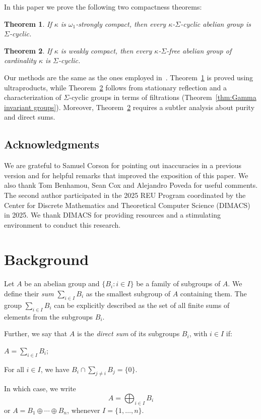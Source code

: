 \documentclass[a4paper]{amsart}
\newenvironment{enumerate-(i)}{\begin{enumerate}[label={\upshape (\roman*)}, leftmargin=2pc]}{\end{enumerate}}
\newtheorem{theorem}{Theorem}[section]
\theoremstyle{definition}
\theoremstyle{remark}
\numberwithin{equation}{section}
\begin{document}
In this paper we prove the following two compactness theorems:

\begin{theorem}
\label{thm : comp Sigma cyclic}
    If \(\kappa\) is \(\omega_1\)-strongly compact, then every \(\kappa\)-\(\Sigma\)-cyclic abelian group is \(\Sigma\)-cyclic.
\end{theorem}

\begin{theorem}
\label{thm : weak comp Sigma cyclic}
     If \(\kappa\) is weakly compact, then every \(\kappa\)-\(\Sigma\)-free abelian group of cardinality \(\kappa\) is \(\Sigma\)-cyclic.
\end{theorem}


Our methods are the same as the ones employed in~\cite{EklMek}. Theorem~\ref{thm : comp Sigma cyclic} is proved using ultraproducts, while Theorem~\ref{thm : weak comp Sigma cyclic} follows from stationary reflection and a characterization of \(\Sigma\)-cyclic groups in terms of filtrations (Theorem~\ref{thm:Gamma invariant groups}).
Moreover, Theorem~\ref{thm : weak comp Sigma cyclic} requires a subtler analysis about purity and direct sums.


\subsection*{Acknowledgments}
We are grateful to Samuel Corson for pointing out inaccuracies in a previous version and for helpful remarks that improved the exposition of this paper. We also thank Tom Benhamou, Sean Cox and Alejandro Poveda for useful comments. The second author participated in the 2025 REU Program coordinated by the 
Center for Discrete Mathematics and Theoretical Computer Science (DIMACS) in 2025. We thank DIMACS for providing resources and a stimulating environment to conduct this research.


\section{Background}
\label{sec : background}

Let \(A\) be an abelian group and \(\{B_i:i\in I\}\) be a family of subgroups of \(A\). We define their \emph{sum} \(\sum_{i\in I} B_i\) as the smallest subgroup of \(A\) containing them. The group \(\sum_{i\in I} B_i\) can be explicitly described as the set of all finite sums of elements from the subgroups \(B_i\).

Further, we say that \(A\) is the \emph{direct sum} of its subgroups \(B_i\), with \(i\in I\) if:
\begin{enumerate-(i)}
\item 
\(A = \sum_{i\in I} B_i\);
\item 
For all \(i \in I\), we have \(B_i\cap \sum_{j\neq i} B_j =\{0\}\).
\end{enumerate-(i)}
In which case, we write \[A = \bigoplus_{i\in I} B_i\] or 
\(A = B_1 \oplus \dotsb \oplus B_n\),
whenever \(I=\{1,\dotsc, n\}\).
\end{document}
